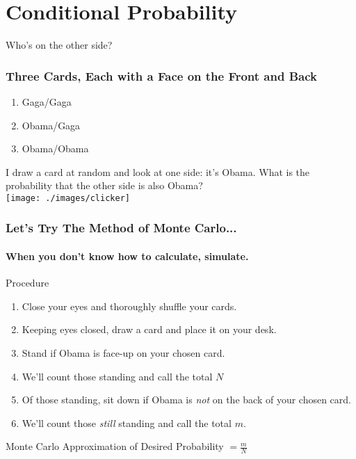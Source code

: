 \section{Conditional Probability}
\begin{frame}
\begin{center}\Huge Who's on the other side?\end{center}
\end{frame}
\begin{frame}
\frametitle{Three Cards, Each with a Face on the Front and Back}
\begin{figure}
\hspace{1em}
\end{figure}
\begin{enumerate}
	\item Gaga/Gaga
	\item Obama/Gaga
	\item Obama/Obama
\end{enumerate} 
\begin{alertblock}{I draw a card at random and look at one side: it's Obama. What is the probability that the other side is also Obama?\\\hfill\texttt{[image: ./images/clicker]} }\end{alertblock}
\end{frame}
\begin{frame}
\frametitle{Let's Try The Method of Monte Carlo...}
\framesubtitle{When you don't know how to calculate, simulate.}
Procedure
\begin{enumerate}
\item Close your eyes and thoroughly shuffle your cards.
\item Keeping eyes closed, draw a card and place it on your desk.
\item Stand if Obama is face-up on your chosen card. 
\item We'll count those standing and call the total $N$
\item Of those standing, sit down if Obama is \emph{not} on the back of your chosen card.
\item We'll count those \emph{still} standing and call the total $m$.
\end{enumerate}

\begin{alertblock}{Monte Carlo Approximation of Desired Probability $\displaystyle= \frac{m}{N}$}\end{alertblock}
\end{frame}

